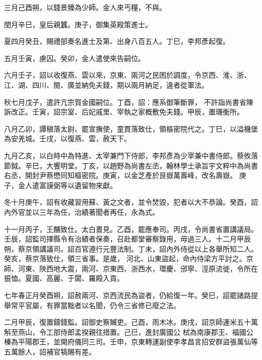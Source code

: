 \begin{pinyinscope}
 三月己酉朔，以錢景臻為少師。金人來丐糧，不與。



 閏月辛巳，皇后親蠶。庚子，御集英殿策進士。



 夏四月癸丑，賜禮部奏名進士及第、出身八百五人。丁巳，李邦彥起復。



 五月壬寅，慮囚。癸卯，金人遣使來告嗣位。



 六月壬子，詔以收復燕、雲以來，京東、兩河之民困於調度，令京西、淮、浙、江、湖、四川、閩、廣並納免夫錢，期以兩月納足，違者從軍法。



 秋七月戊子，遣許亢宗賀金國嗣位。丁酉，詔：應系御筆斷罪，
 不許詣尚書省陳訴改正。壬寅，詔宗室、后妃戚里、宰執之家概敷免夫錢。甲辰，置璣衡所。



 八月乙卯，譚稹落太尉、罷宣撫使，童貫落致仕，領樞密院代之。丁巳，以溢機堡為安羌城。壬戌，以復燕、雲，赦天下。



 九月乙亥，以白時中為特進、太宰兼門下侍郎，李邦彥為少宰兼中書侍郎。蔡攸落節鉞。辛巳，大饗明堂。丁亥，以趙野為尚書左丞，翰林學士承旨宇文粹中為尚書右丞，開封尹蔡懋同知樞密院。庚寅，以金芝產於艮嶽萬壽峰，改名壽嶽。
 庚子，金人遣富謨弼等以遺留物來獻。



 冬十月庚午，詔有收藏習用蘇、黃之文者，並令焚毀，犯者以大不恭論。癸酉，詔內外官並以三年為任，治績著聞者再任，永為式。



 十一月丙子，王黼致仕。太白晝見。乙酉，罷應奉司。丙戌，令尚書省置講議局。壬辰，詔監司擇縣令有治績者保奏，召赴都堂審察錄用，毋過三人。十二月甲辰朔，蔡京領講議司。詔百官遵行元豐法制。丁未，詔內外侍從以上各舉所知二人。癸亥，蔡京落致仕，領三省事。是歲，
 河北、山東盜起，命內侍梁方平討之。京師、河東、陜西地大震，兩河、京東西、浙西水，環慶、邠寧、涇原流徙，令所在振恤。夏國、高麗、于闐、羅殿入貢。



 七年春正月癸酉朔，詔赦兩河、京西流民為盜者，仍給復一年。癸巳，詔罷諸路提舉常平官屬，有罪當黜者以名聞，仍令三省修已廢之法。



 二月甲辰，復置鑄錢監。詔御史察贓吏。己酉，雨木冰。庚戌，詔京師運米五十萬斛至燕山，令工部侍郎孟揆親往措置。己巳，進封廣國公
 栻為南康郡王、福國公榛為平陽郡王，並開府儀同三司。壬申，京東轉運副使李孝昌言招安群盜張萬仙等五萬餘人，詔補官犒賜有差。




\end{pinyinscope}
